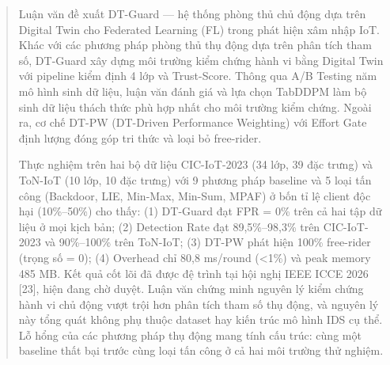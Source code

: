 \begin{abstract}
\addchaptertocentry{\tomtatname}
Luận văn đề xuất DT-Guard --- hệ thống phòng thủ chủ động dựa trên Digital Twin cho Federated Learning (FL) trong phát hiện xâm nhập IoT. Khác với các phương pháp phòng thủ thụ động dựa trên phân tích tham số, DT-Guard xây dựng môi trường kiểm chứng hành vi bằng Digital Twin với pipeline kiểm định 4 lớp và Trust-Score. Thông qua A/B Testing năm mô hình sinh dữ liệu, luận văn đánh giá và lựa chọn TabDDPM làm bộ sinh dữ liệu thách thức phù hợp nhất cho môi trường kiểm chứng. Ngoài ra, cơ chế DT-PW (DT-Driven Performance Weighting) với Effort Gate định lượng đóng góp tri thức và loại bỏ free-rider.

Thực nghiệm trên hai bộ dữ liệu CIC-IoT-2023 (34 lớp, 39 đặc trưng) và ToN-IoT (10 lớp, 10 đặc trưng) với 9 phương pháp baseline và 5 loại tấn công (Backdoor, LIE, Min-Max, Min-Sum, MPAF) ở bốn tỉ lệ client độc hại (10\%--50\%) cho thấy: (1) DT-Guard đạt FPR = 0\% trên cả hai tập dữ liệu ở mọi kịch bản; (2) Detection Rate đạt 89,5\%--98,3\% trên CIC-IoT-2023 và 90\%--100\% trên ToN-IoT; (3) DT-PW phát hiện 100\% free-rider (trọng số = 0); (4) Overhead chỉ 80,8 ms/round (\textless 1\%) và peak memory 485 MB. Kết quả cốt lõi đã được đệ trình tại hội nghị IEEE ICCE 2026 {[}23{]}, hiện đang chờ duyệt. Luận văn chứng minh nguyên lý kiểm chứng hành vi chủ động vượt trội hơn phân tích tham số thụ động, và nguyên lý này tổng quát không phụ thuộc dataset hay kiến trúc mô hình IDS cụ thể. Lỗ hổng của các phương pháp thụ động mang tính cấu trúc: cùng một baseline thất bại trước cùng loại tấn công ở cả hai môi trường thử nghiệm.
\end{abstract}
